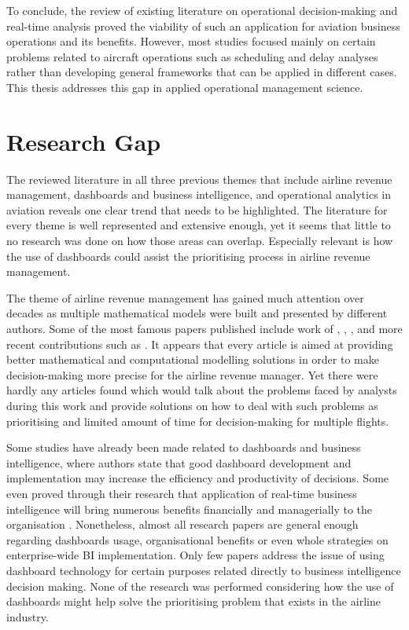 To conclude, the review of existing literature on operational decision-making and real-time analysis proved the viability of such an application for aviation business operations and its benefits. However, most studies focused mainly on certain problems related to aircraft operations such as scheduling and delay analyses rather than developing general frameworks that can be applied in different cases. This thesis addresses this gap in applied operational management science.

\section{Research Gap}
\label{sec:ch2:gap}

The reviewed literature in all three previous themes that include airline revenue management, dashboards and business intelligence, and operational analytics in aviation reveals one clear trend that needs to be highlighted. The literature for every theme is well represented and extensive enough, yet it seems that little to no research was done on how those areas can overlap. Especially relevant is how the use of dashboards could assist the prioritising process in airline revenue management.

The theme of airline revenue management has gained much attention over decades as multiple mathematical models were built and presented by different authors. Some of the most famous papers published include work of \citet{Belobaba1987, Belobaba1989}, \citet{LeeHersh1993}, \citet{PakPiersma2002}, and more recent contributions such as \citet{FiigIslerHopperstadBelobaba2010}. It appears that every article is aimed at providing better mathematical and computational modelling solutions in order to make decision-making more precise for the airline revenue manager. Yet there were hardly any articles found which would talk about the problems faced by analysts during this work and provide solutions on how to deal with such problems as prioritising and limited amount of time for decision-making for multiple flights.

Some studies have already been made related to dashboards and business intelligence, where authors state that good dashboard development and implementation may increase the efficiency and productivity of decisions. Some even proved through their research that application of real-time business intelligence will bring numerous benefits financially and managerially to the organisation \citep{Andronie2015, YigitbasiogluVelcu2012, WatsonWixomHoffer2006, Rouhani2016}. Nonetheless, almost all research papers are general enough regarding dashboards usage, organisational benefits or even whole strategies on enterprise-wide BI implementation. Only few papers address the issue of using dashboard technology for certain purposes related directly to business intelligence decision making. None of the research was performed considering how the use of dashboards might help solve the prioritising problem that exists in the airline industry.


